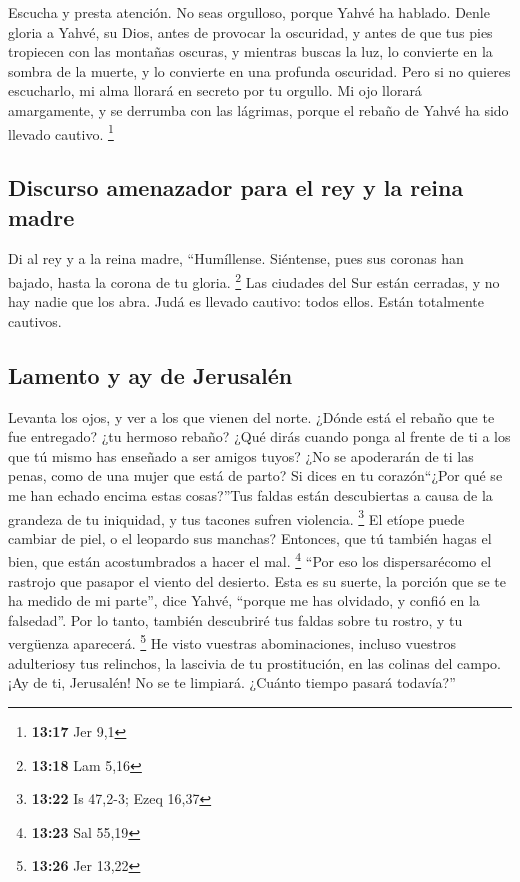\begin{paracol}{2}
 Escucha y presta atención. No seas orgulloso, porque
Yahvé ha hablado.  Denle gloria a Yahvé, su Dios, antes
de provocar la oscuridad, y antes de que tus pies tropiecen con las
montañas oscuras, y mientras buscas la luz, lo convierte en la sombra de
la muerte, y lo convierte en una profunda oscuridad. 
Pero si no quieres escucharlo, mi alma llorará en secreto por tu
orgullo. Mi ojo llorará amargamente, y se derrumba con las lágrimas,
porque el rebaño de Yahvé ha sido llevado cautivo. \footnote{\textbf{13:17}
  Jer 9,1}

\hypertarget{discurso-amenazador-para-el-rey-y-la-reina-madre}{%
\subsection{Discurso amenazador para el rey y la reina
madre}\label{discurso-amenazador-para-el-rey-y-la-reina-madre}}

 Di al rey y a la reina madre, ``Humíllense. Siéntense,
pues sus coronas han bajado, hasta la corona de tu gloria. \footnote{\textbf{13:18}
  Lam 5,16}  Las ciudades del Sur están cerradas, y no
hay nadie que los abra. Judá es llevado cautivo: todos ellos. Están
totalmente cautivos.

\hypertarget{lamento-y-ay-de-jerusaluxe9n}{%
\subsection{Lamento y ay de
Jerusalén}\label{lamento-y-ay-de-jerusaluxe9n}}

 Levanta los ojos, y ver a los que vienen del norte.
¿Dónde está el rebaño que te fue entregado? ¿tu hermoso rebaño?
 ¿Qué dirás cuando ponga al frente de ti a los que tú
mismo has enseñado a ser amigos tuyos? ¿No se apoderarán de ti las
penas, como de una mujer que está de parto?  Si dices en
tu corazón``¿Por qué se me han echado encima estas cosas?''Tus faldas
están descubiertas a causa de la grandeza de tu iniquidad, y tus tacones
sufren violencia. \footnote{\textbf{13:22} Is 47,2-3; Ezeq 16,37}
 El etíope puede cambiar de piel, o el leopardo sus
manchas? Entonces, que tú también hagas el bien, que están acostumbrados
a hacer el mal. \footnote{\textbf{13:23} Sal 55,19} 
``Por eso los dispersarécomo el rastrojo que pasapor el viento del
desierto.  Esta es su suerte, la porción que se te ha
medido de mi parte'', dice Yahvé, ``porque me has olvidado, y confió en
la falsedad''.  Por lo tanto, también descubriré tus
faldas sobre tu rostro, y tu vergüenza aparecerá. \footnote{\textbf{13:26}
  Jer 13,22}  He visto vuestras abominaciones, incluso
vuestros adulteriosy tus relinchos, la lascivia de tu prostitución, en
las colinas del campo. ¡Ay de ti, Jerusalén! No se te limpiará. ¿Cuánto
tiempo pasará todavía?''


\end{paracol}
